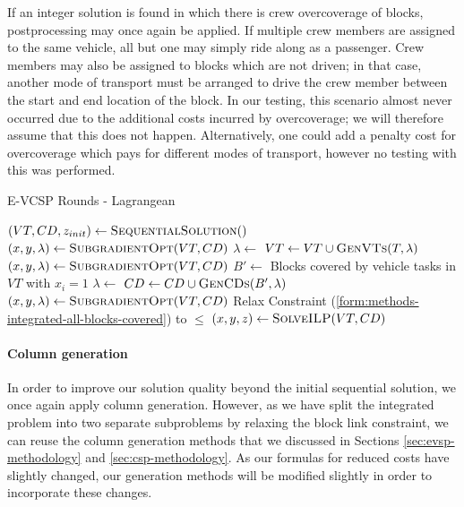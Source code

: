 \documentclass[]{article}
\begin{document}
If an integer solution is found in which there is crew overcoverage of blocks, postprocessing may once again be applied. If multiple crew members are assigned to the same vehicle, all but one may simply ride along as a passenger. Crew members may also be assigned to blocks which are not driven; in that case, another mode of transport must be arranged to drive the crew member between the start and end location of the block. In our testing, this scenario almost never occurred due to the additional costs incurred by overcoverage; we will therefore assume that this does not happen. Alternatively, one could add a penalty cost for overcoverage which pays for different modes of transport, however no testing with this was performed.

\begin{algorithm}
\caption{E-VCSP Rounds - Lagrangean}\label{alg:E-VCSP-lagrange}
\begin{algorithmic}
\State $(VT, CD, z_{init}) \gets \Call{SequentialSolution}$
\State $(x, y, \lambda) \gets \Call{SubgradientOpt}{VT, CD}$
    \State $\lambda \gets$ 
    \State $VT \gets VT \cup \Call{GenVTs}{T, \lambda}$
    \State $(x, y, \lambda) \gets \Call{SubgradientOpt}{VT, CD}$
  \EndFor
    \State $B' \gets$ Blocks covered by vehicle tasks in $VT$ with $x_i = 1$
    \State $\lambda \gets$ 
    \State $CD \gets CD \cup \Call{GenCDs}{B', \lambda}$
    \State $(x, y, \lambda) \gets \Call{SubgradientOpt}{VT, CD}$
  \EndFor
\EndWhile
\State Relax Constraint (\ref{form:methods-integrated-all-blocks-covered}) to $\leq$
\State $(x, y, z) \gets \Call{SolveILP}{VT, CD}$
\end{algorithmic}
\end{algorithm}

\paragraph{Column generation} \label{sec:evcsp-cg}
In order to improve our solution quality beyond the initial sequential solution, we once again apply column generation. However, as we have split the integrated problem into two separate subproblems by relaxing the block link constraint, we can reuse the column generation methods that we discussed in Sections \ref{sec:evsp-methodology} and \ref{sec:csp-methodology}. As our formulas for reduced costs have slightly changed, our generation methods will be modified slightly in order to incorporate these changes.
\end{document}
